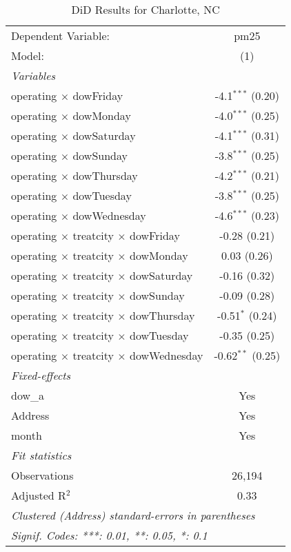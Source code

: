 
\begin{table}[htbp]
   \caption{DiD Results for Charlotte, NC}
   \centering
   \begin{tabular}{lc}
      \tabularnewline \midrule \midrule
      Dependent Variable:                                  & pm25\\  
      Model:                                               & (1)\\  
      \midrule
      \emph{Variables}\\
      operating $\times$ dowFriday                         & -4.1$^{***}$ (0.20)\\   
      operating $\times$ dowMonday                         & -4.0$^{***}$ (0.25)\\   
      operating $\times$ dowSaturday                       & -4.1$^{***}$ (0.31)\\   
      operating $\times$ dowSunday                         & -3.8$^{***}$ (0.25)\\   
      operating $\times$ dowThursday                       & -4.2$^{***}$ (0.21)\\   
      operating $\times$ dowTuesday                        & -3.8$^{***}$ (0.25)\\   
      operating $\times$ dowWednesday                      & -4.6$^{***}$ (0.23)\\   
      operating $\times$ treatcity $\times$ dowFriday      & -0.28 (0.21)\\   
      operating $\times$ treatcity $\times$ dowMonday      & 0.03 (0.26)\\   
      operating $\times$ treatcity $\times$ dowSaturday    & -0.16 (0.32)\\   
      operating $\times$ treatcity $\times$ dowSunday      & -0.09 (0.28)\\   
      operating $\times$ treatcity $\times$ dowThursday    & -0.51$^{*}$ (0.24)\\   
      operating $\times$ treatcity $\times$ dowTuesday     & -0.35 (0.25)\\   
      operating $\times$ treatcity $\times$ dowWednesday   & -0.62$^{**}$ (0.25)\\   
      \midrule
      \emph{Fixed-effects}\\
      dow\_a                                               & Yes\\  
      Address                                              & Yes\\  
      month                                                & Yes\\  
      \midrule
      \emph{Fit statistics}\\
      Observations                                         & 26,194\\  
      Adjusted R$^2$                                       & 0.33\\  
      \midrule \midrule
      \multicolumn{2}{l}{\emph{Clustered (Address) standard-errors in parentheses}}\\
      \multicolumn{2}{l}{\emph{Signif. Codes: ***: 0.01, **: 0.05, *: 0.1}}\\
   \end{tabular}
\end{table}


